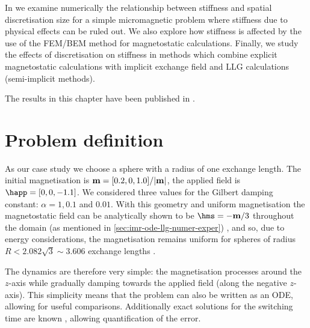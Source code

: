 In  we examine numerically the relationship between stiffness and spatial discretisation size for a simple micromagnetic problem where stiffness due to physical effects can be ruled out.
We also explore how stiffness is affected by the use of the FEM/BEM method for magnetostatic calculations.
Finally, we study the effects of discretisation on stiffness in methods which combine explicit magnetostatic calculations with implicit exchange field and LLG calculations (\ie semi-implicit methods).

The results in this chapter have been published in \cite{Shepherd2014}.


\section{Problem definition}

As our case study we choose a sphere with a radius of one exchange length.
The initial magnetisation is $\boldsymbol{\mathrm{m}} = [0.2, 0, 1.0]/|\boldsymbol{\mathrm{m}}|$, the applied field is $\happ =[0, 0, -1.1]$.
We considered three values for the Gilbert damping constant: $\alpha = 1, 0.1$ and $0.01$.
With this geometry and uniform magnetisation the magnetostatic field can be analytically shown to be $\hms = -\mv/3$ throughout the domain (as mentioned in \cref{sec:imr-ode-llg-numer-exper}) \cite[112]{Aharoni1996}, and so, due to energy considerations, the magnetisation remains uniform for spheres of radius $R < 2.082 \sqrt{3} \sim 3.606$ exchange lengths \cite[211]{HubertSchafer}.

The dynamics are therefore very simple: the magnetisation processes around the $z$-axis while gradually damping towards the applied field (along the negative $z$-axis).
This simplicity means that the problem can also be written as an ODE, allowing for useful comparisons.
Additionally exact solutions for the switching time are known \cite{Mallinson2000}, allowing quantification of the error.



